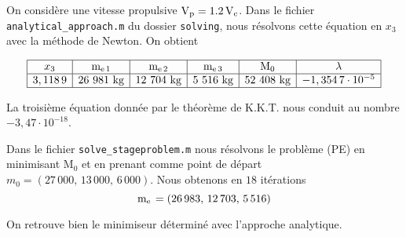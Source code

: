 \question On considère une vitesse propulsive $\mathrm{V}_{\mathrm{p}} = 1.2\,\mathrm{V}_{\mathrm{c}}$. Dans le fichier \\\verb+analytical_approach.m+ du dossier \verb+solving+, nous résolvons cette équation en $x_3$ avec la méthode de Newton. On obtient

\begin{center}
\[\begin{array}{|c|c|c|c|c|c|}\hline
x_3 & \masspropel{1} & \masspropel{2} & \masspropel{3} & \mathrm{M}_{0} & \lambda\\\hline
3,118\,9 & 26\ 981\text{ kg}& 12\ 704\text{ kg} & 5\ 516\text{ kg} & 52\ 408\text{ kg} & -1,354\,7\cdot 10^{-5}\\\hline
\end{array}\]
\end{center}

La troisième équation donnée par le théorème de K.K.T. nous conduit au nombre $-3,47\cdot 10^{-18}$.

\question Dans le fichier \lstinline+solve_stageproblem.m+ nous résolvons le problème (PE) en minimisant $\mathrm{M}_0$ et en prenant comme point de départ $m_{0}=(27\,000,\,13\,000,\,6\,000)$. Nous obtenons en $18$ itérations
\[\mathrm{m}_{\mathrm{e}\,} = (26\,983,\,12\,703,\,5\,516)\]

On retrouve bien le minimiseur déterminé avec l'approche analytique.